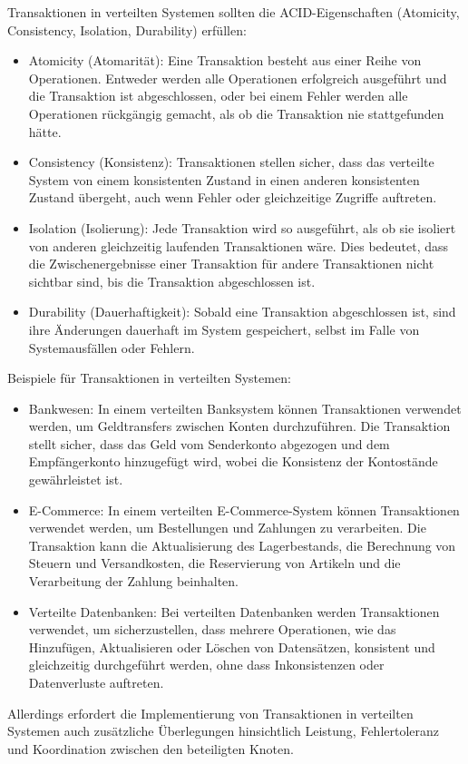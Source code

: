\documentclass[../vs-script-first-v01.tex]{subfiles}
\begin{document}
Transaktionen in verteilten Systemen sollten die ACID-Eigenschaften (Atomicity, Consistency, Isolation, Durability) erfüllen:
\begin{itemize}
\item Atomicity (Atomarität): Eine Transaktion besteht aus einer Reihe von Operationen. Entweder werden alle Operationen erfolgreich ausgeführt und die Transaktion ist abgeschlossen, oder bei einem Fehler werden alle Operationen rückgängig gemacht, als ob die Transaktion nie stattgefunden hätte.
\item Consistency (Konsistenz): Transaktionen stellen sicher, dass das verteilte System von einem konsistenten Zustand in einen anderen konsistenten Zustand übergeht, auch wenn Fehler oder gleichzeitige Zugriffe auftreten.
\item Isolation (Isolierung): Jede Transaktion wird so ausgeführt, als ob sie isoliert von anderen gleichzeitig laufenden Transaktionen wäre. Dies bedeutet, dass die Zwischenergebnisse einer Transaktion für andere Transaktionen nicht sichtbar sind, bis die Transaktion abgeschlossen ist.
\item Durability (Dauerhaftigkeit): Sobald eine Transaktion abgeschlossen ist, sind ihre Änderungen dauerhaft im System gespeichert, selbst im Falle von Systemausfällen oder Fehlern.
\end{itemize}
Beispiele für Transaktionen in verteilten Systemen:
\begin{itemize}
\item Bankwesen: In einem verteilten Banksystem können Transaktionen verwendet werden, um Geldtransfers zwischen Konten durchzuführen. Die Transaktion stellt sicher, dass das Geld vom Senderkonto abgezogen und dem Empfängerkonto hinzugefügt wird, wobei die Konsistenz der Kontostände gewährleistet ist.
\item E-Commerce: In einem verteilten E-Commerce-System können Transaktionen verwendet werden, um Bestellungen und Zahlungen zu verarbeiten. Die Transaktion kann die Aktualisierung des Lagerbestands, die Berechnung von Steuern und Versandkosten, die Reservierung von Artikeln und die Verarbeitung der Zahlung beinhalten.
\item Verteilte Datenbanken: Bei verteilten Datenbanken werden Transaktionen verwendet, um sicherzustellen, dass mehrere Operationen, wie das Hinzufügen, Aktualisieren oder Löschen von Datensätzen, konsistent und gleichzeitig durchgeführt werden, ohne dass Inkonsistenzen oder Datenverluste auftreten.
\end{itemize}
Allerdings erfordert die Implementierung von Transaktionen in verteilten Systemen auch zusätzliche Überlegungen hinsichtlich Leistung, Fehlertoleranz und Koordination zwischen den beteiligten Knoten.
\end{document}
